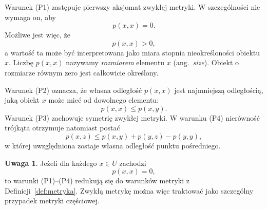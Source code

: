 \documentclass[11pt,a4paper]{article}
\theoremstyle{definition}
\newtheorem{uwaga}[definicja]{Uwaga}
\theoremstyle{plain}
\begin{document}
Warunek (P1) zastępuje pierwszy aksjomat zwykłej metryki. W szczególności
nie wymaga on, aby
\[
p(x,x)=0.
\]
Możliwe jest więc, że
\[
p(x,x)>0,
\]
a wartość ta może być interpretowana jako miara stopnia nieokreśloności
obiektu $x$. Liczbę $p(x,x)$ nazywamy \emph{rozmiarem} elementu $x$
(ang.\ \emph{size}). Obiekt o rozmiarze równym zero jest całkowicie
określony.

Warunek (P2) oznacza, że własna odległość $p(x,x)$ jest najmniejszą
odległością, jaką obiekt $x$ może mieć od dowolnego elementu:
\[
p(x,x)\leq p(x,y).
\]
Warunek (P3) zachowuje symetrię zwykłej metryki. W warunku (P4)
nierówność trójkąta otrzymuje natomiast postać
\[
p(x,z)\leq p(x,y)+p(y,z)-p(y,y),
\]
w której uwzględniona zostaje własna odległość punktu pośredniego.

\begin{uwaga}
	Jeżeli dla każdego $x\in U$ zachodzi
	\[
	p(x,x)=0,
	\]
	to warunki (P1)--(P4) redukują się do warunków metryki z
	Definicji~\ref{def:metryka}. Zwykłą metrykę można więc traktować jako
	szczególny przypadek metryki częściowej.
\end{uwaga}
\end{document}
